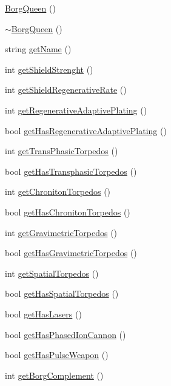 \begin{DoxyCompactItemize}
\item 
\hyperlink{classBorgQueen_a76607d47c521568462adcc3c3b65cbce}{BorgQueen} ()
\item 
\hyperlink{classBorgQueen_a5e2d0c2a5b5c3b00088776e2272c17f0}{$\sim$BorgQueen} ()
\item 
string \hyperlink{classBorgQueen_a51bd430d9b7b50605622d489bae898cb}{getName} ()
\item 
int \hyperlink{classBorgQueen_aa36f69293ff2c3cb5df255fee9b2d9e8}{getShieldStrenght} ()
\item 
int \hyperlink{classBorgQueen_ab7c7d1068ca9e031ab4c742d44150784}{getShieldRegenerativeRate} ()
\item 
int \hyperlink{classBorgQueen_a9f280ccd7ae93b4cf90a638189059b5b}{getRegenerativeAdaptivePlating} ()
\item 
bool \hyperlink{classBorgQueen_a269dea27e5cccc2cef605153bef654bd}{getHasRegenerativeAdaptivePlating} ()
\item 
int \hyperlink{classBorgQueen_a1d23b2f941324cb88de797090a40a406}{getTransPhasicTorpedos} ()
\item 
bool \hyperlink{classBorgQueen_a934f3c7e409e8e07fc716c53af7027ed}{getHasTransphasicTorpedos} ()
\item 
int \hyperlink{classBorgQueen_ac533d0fde52c0119abb63862b1c9b01e}{getChronitonTorpedos} ()
\item 
bool \hyperlink{classBorgQueen_a22291a2f8d58dbb517975f490ea6bad2}{getHasChronitonTorpedos} ()
\item 
int \hyperlink{classBorgQueen_ac4e4aff8c051083941bcb7d9c8ae4525}{getGravimetricTorpedos} ()
\item 
bool \hyperlink{classBorgQueen_ade43bf6397423dd698087c19ecd28707}{getHasGravimetricTorpedos} ()
\item 
int \hyperlink{classBorgQueen_a9f7a18df2032943b5211d6fa6b5a78d9}{getSpatialTorpedos} ()
\item 
bool \hyperlink{classBorgQueen_a45bff6005961ed11202666df5ad0ea5e}{getHasSpatialTorpedos} ()
\item 
bool \hyperlink{classBorgQueen_a66488c3adb0ae7603d97acd1cae540d5}{getHasLasers} ()
\item 
bool \hyperlink{classBorgQueen_ad443100edc3438d13c2125ada2e813b5}{getHasPhasedIonCannon} ()
\item 
bool \hyperlink{classBorgQueen_afff65fc18c7fca051258a34e44e1c56a}{getHasPulseWeapon} ()
\item 
int \hyperlink{classBorgQueen_aaceb90436d0f878f38346fcc6cfc846c}{getBorgComplement} ()

\end{DoxyCompactItemize}
